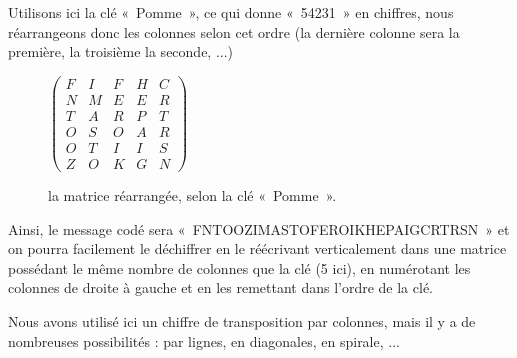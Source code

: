 Utilisons ici la clé «~Pomme~», ce qui donne «~54231~» en chiffres,
nous réarrangeons donc les colonnes selon cet ordre (la dernière
colonne sera la première, la troisième la seconde, ...)

\begin{figure}[h]
  \begin{center}
  $
  \left(
    \begin{array}{ccccc}
      F & I & F & H & C \\ 
      N & M & E & E & R \\
      T & A & R & P & T \\
      O & S & O & A & R \\
      O & T & I & I & S \\
      Z & O & K & G & N
    \end{array}
  \right)
  $
  \end{center}
  \caption{la matrice réarrangée, selon la clé «~Pomme~».}
  \label{fig:TranspositionMatriceCode}
\end{figure}

Ainsi, le message codé sera «~FNTOOZIMASTOFEROIKHEPAIGCRTRSN~» et on
pourra facilement le déchiffrer en le réécrivant verticalement dans
une matrice possédant le même nombre de colonnes que la clé (5 ici),
en numérotant les colonnes de droite à gauche et en les remettant dans
l'ordre de la clé.

Nous avons utilisé ici un chiffre de transposition par colonnes, mais
il y a de nombreuses possibilités : par lignes, en diagonales, en
spirale, ...
